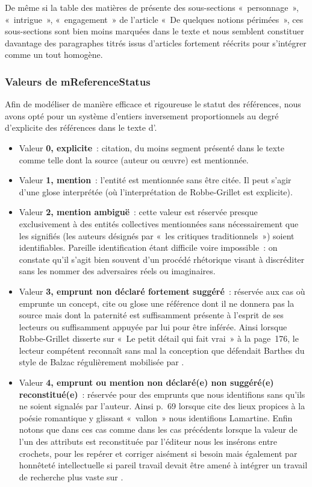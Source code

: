 \documentclass[12pt, a4paper]{article}
\begin{document}
De même si la table des matières de \punr{} présente des sous-sections «~personnage~», «~intrigue~», «~engagement~» de l'article «~De quelques notions périmées~», ces sous-sections sont bien moins marquées dans le texte et nous semblent constituer davantage des paragraphes titrés issus d'articles fortement réécrits pour s'intégrer comme un tout homogène.



\subsubsection{Valeurs de mReferenceStatus}
Afin de modéliser de manière efficace et rigoureuse le statut des références, nous avons opté pour un système d'entiers inversement proportionnels au degré d'explicite des références dans le texte d'\robbe.

\begin{itemize}
    \item Valeur \textbf{0, explicite}~: citation, du moins segment présenté dans le texte comme telle dont la source (auteur ou œuvre) est mentionnée.
    \item Valeur \textbf{1, mention}~: l'entité est mentionnée sans être citée. Il peut s'agir d'une glose interprétée (où l'interprétation de Robbe-Grillet est explicite).
    \item Valeur \textbf{2, mention ambiguë}~: cette valeur est réservée presque exclusivement à des entités collectives mentionnées sans nécessairement que les signifiés (les auteurs désignés par «~les critiques traditionnels~») soient identifiables. Pareille identification étant difficile voire impossible~: on constate qu'il s'agit bien souvent d'un procédé rhétorique visant à discréditer sans les nommer des adversaires réels ou imaginaires.
    \item Valeur \textbf{3, emprunt non déclaré fortement suggéré}~: réservée aux cas où \robbe{} emprunte un concept, cite ou glose une référence dont il ne donnera pas la source mais dont la paternité est suffisamment présente à l'esprit de ses lecteurs ou suffisamment appuyée par lui pour être inférée. Ainsi lorsque Robbe-Grillet disserte sur «~Le petit détail qui fait vrai~» à la page~176, le lecteur compétent reconnaît sans mal la conception que défendait Barthes du style de Balzac régulièrement mobilisée par \robbe.
    \item Valeur \textbf{4, emprunt ou mention non déclaré(e) non suggéré(e) reconstitué(e)}~: réservée pour des emprunts que nous identifions sans qu'ils ne soient signalés par l'auteur. Ainsi p.~69 lorsque \robbe{} cite des lieux propices à la poésie romantique y glissant «~vallon~» nous identifions Lamartine. Enfin notons que dans ces cas comme dans les cas précédents lorsque la valeur de l'un des attributs est reconstituée par l'éditeur nous les insérons entre crochets, pour les repérer et corriger aisément si besoin mais également par honnêteté intellectuelle si pareil travail devait être amené à intégrer un travail de recherche plus vaste sur \punr{}.
\end{itemize}
\end{document}
